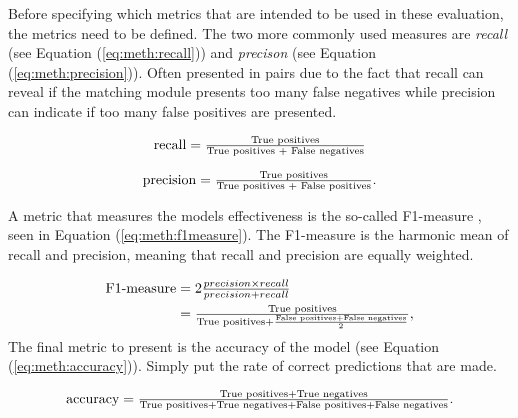 Before specifying which metrics that are intended to be used in these evaluation, the metrics need to be defined. The two more commonly used measures are \emph{recall} (see Equation (\ref{eq:meth:recall})) and \emph{precison} (see Equation (\ref{eq:meth:precision})). Often presented in pairs due to the fact that recall can reveal if the matching module presents too many false negatives while precision can indicate if too many false positives are presented. 

\begin{equation}
\label{eq:meth:recall}
\textnormal{recall} = \tfrac{\textnormal{True positives}}{\textnormal{True positives } + \textnormal{ False negatives}}
\end{equation}

\begin{equation}
\label{eq:meth:precision}
\textnormal{precision} = \tfrac{\textnormal{True positives}}{\textnormal{True positives } + \textnormal{ False positives}}.
\end{equation}

A metric that measures the models effectiveness is the so-called F1-measure \cite{powers2011evaluation}, seen in Equation (\ref{eq:meth:f1measure}). The F1-measure is the harmonic mean of recall and precision, meaning that recall and precision are equally weighted. 

\begin{equation}
\label{eq:meth:f1measure}
\begin{split}
\textnormal{F1-measure} &= 2 \tfrac{precision \times recall}{precision + recall}\\
&= \tfrac{\textnormal{True positives}}{\textnormal{True positives} +\frac{\textnormal{False positives}+\textnormal{False negatives}}{2}},
\end{split}
\end{equation}
The final metric to present is the accuracy of the model (see Equation (\ref{eq:meth:accuracy})).\todo{,} Simply put the rate of correct predictions that are made. 

\begin{equation}
\label{eq:meth:accuracy}
\textnormal{accuracy} = \tfrac{\textnormal{True positives} + \textnormal{True negatives}}{\textnormal{True positives} + \textnormal{True negatives}+ \textnormal{False positives} + \textnormal{False negatives}}.
\end{equation}


